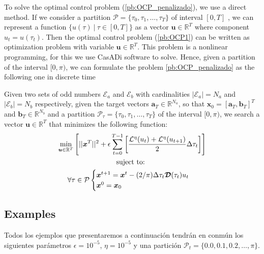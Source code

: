 To solve the optimal control problem (\ref{pb:OCP_penalizado}), we use a direct method. 
%
If we consider a partition $\mathcal{P} = \{\tau_0,\tau_1,\dots,\tau_{T}\}$ of interval $[0,T]$ , we can represent a function $\{ u(\tau) \ | \ \tau \in [0,T]\}$ as a vector $\bm{u} \in \mathbb{R}^{T}$ where component $u_t = u(\tau_t)$.  
%
Then the optimal control problem (\ref{pb:OCP1}) can be written as optimization problem with variable $\bm{u} \in \mathbb{R}^{T}$. This problem is a nonlinear programming, for this we use CasADi software to solve. 
%
Hence, given a partition of the interval $[0,\pi)$, we can formulate the problem \ref{pb:OCP_penalizado} as the following one in discrete time
\newline

\begin{problem}\label{pb:numOCP2}
Given two sets of odd numbers $\mathcal{E}_a$ and $\mathcal{E}_b$ with cardinalities $|\mathcal{E}_a| = N_a$ and $|\mathcal{E}_b| = N_b$ respectively, given the target vectors $\bm{a}_T  \in \mathbb{R}^{N_a}$, so that $\bm{x}_0 = [\bm{a}_T,\bm{b}_T]^T$ and $\bm{b}_T \in \mathbb{R}^{N_b}$ and a partition $\mathcal{P}_\tau = \{\tau_0,\tau_1,\dots,\tau_{T}\}$ of the interval $[0,\pi)$, we search a vector $\bm{u} \in \mathbb{R}^{T}$ that minimizes the following function:
\begin{gather}
        \min_{\bm{u} \in \mathbb{R}^{T} } 
        \Bigg[ 
        || \bm{x}^{T}||^2
        + \epsilon  
        \sum_{t=0}^{T-1} 
            \bigg[ \frac{\mathcal{L}^\eta(u_{t}) + \mathcal{L}^\eta(u_{t+1})}{2}\Delta\tau_t \bigg]  \Bigg]  \\
        \notag \text{suject to: } \\
        \forall \tau \in \mathcal{P} \begin{cases}
            \bm{x}^{t+1} = \bm{x}^{t} - (2/\pi)\Delta \tau_t \bm{\mathcal{D}}(\tau_t)u_t \\
            \bm{x}^0 = \bm{x}_0
        \end{cases} 
\end{gather}
\end{problem}

\subsection{Examples}

Todos los ejemplos que presentaremos a continuación tendrán en conmún los siguientes parámetros $\epsilon = 10^{-5}$, $\eta = 10^{-5}$ y una partición $\mathcal{P}_t = \{0.0 , 0.1, 0.2 ,\dots,\pi\}$.

